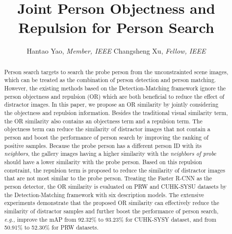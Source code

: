 \documentclass[journal]{IEEEtran}
\begin{document}
\title{Joint Person Objectness and Repulsion for Person Search}
\author{
Hantao Yao, \emph{Member, IEEE}
Changsheng Xu, \emph{Fellow, IEEE}


}

\maketitle
\begin{abstract}
Person search targets to search the probe person from the unconstrainted scene images, which can be treated as the combination of person detection and person matching. 
However, the existing methods based on the Detection-Matching framework ignore the person objectness and repulsion (OR) which are both beneficial to reduce the effect of distractor images. 
In this paper, we propose an OR similarity by jointly considering the objectness and repulsion information.
Besides the traditional visual similarity term, the OR similarity also contains an objectness term and a repulsion term.
The objectness term can reduce the similarity of distractor images that not contain a person and boost the performance of person search by improving the ranking of positive samples.
Because the probe person has a different person ID with its \emph{neighbors}, the gallery images having a higher similarity with the \emph{neighbors of probe} should have a lower similarity with the probe person.
Based on this repulsion constraint, the repulsion term is proposed to reduce the similarity of distractor images that are not most similar to the probe person. 
Treating the Faster R-CNN as the person detector, the OR similarity is evaluated on PRW and CUHK-SYSU datasets by the Detection-Matching framework with six description models.
The extensive experiments demonstrate that the proposed OR similarity can effectively reduce the similarity of distractor samples and further boost the performance of person search, \emph{e.g.,} improve the mAP from 92.32\%  to 93.23\% for CUHK-SYSY dataset, and from 50.91\% to 52.30\% for PRW datasets.
\end{abstract}
\end{document}
